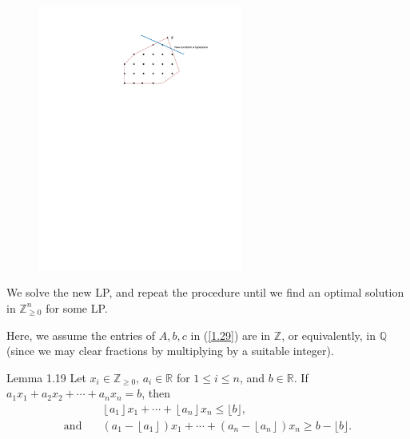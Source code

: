 \begin{figure}[htbp]
    \centering
    \includegraphics[width = 0.6\textwidth, trim = {6cm, 18cm, 0cm, 1cm}, clip]{document/2.drawio.pdf}
\end{figure}

We solve the new LP, and repeat the procedure until we find an optimal solution in $\mathbb{Z}_{\geqslant 0}^n$ for some LP.

Here, we assume the entries of $A, b, c$ in (\ref{1.29}) are in $\mathbb{Z}$, or equivalently, in $\mathbb{Q}$ (since we may clear fractions by multiplying by a suitable integer).

\begin{lemma}
    Lemma 1.19 Let $x_i\in\mathbb{Z}_{\ge 0}$, $a_i\in\mathbb{R}$ for $1\leqslant i\leqslant n$, and $b\in \mathbb{R}$. If $a_1x_1+a_2x_2+\cdots +a_nx_n=b$, then
    \begin{align*}
        &\left\lfloor a_1\right\rfloor x_1+\cdots+\left\lfloor a_n\right\rfloor x_n \leqslant\lfloor b\rfloor \text {, }\\
        \text{and}\quad & \left(a_1-\left\lfloor a_1\right\rfloor\right) x_1+\cdots+\left(a_n-\left\lfloor a_n\right\rfloor\right) x_n \geqslant b-\lfloor b\rfloor.
    \end{align*}
\end{lemma}

